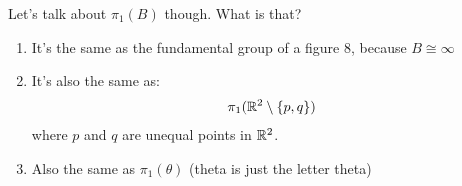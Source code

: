 \begin{enumerate}
        Let's talk about $\pi_1(B)$ though. What is that?
        \begin{enumerate}
            \item It's the same as the fundamental group of a figure 8, because $B\cong \infty$
            \item It's also the same as:
                \begin{align*}
                    \pi_1(\mathbb{R}^2\setminus \{p,q\})\\
                \end{align*}
                where $p$ and $q$ are unequal points in $\mathbb{R}^2$.
            \item Also the same as $\pi_1(\theta)$ (theta is just the letter theta)
                
        \end{enumerate}
\end{enumerate}

